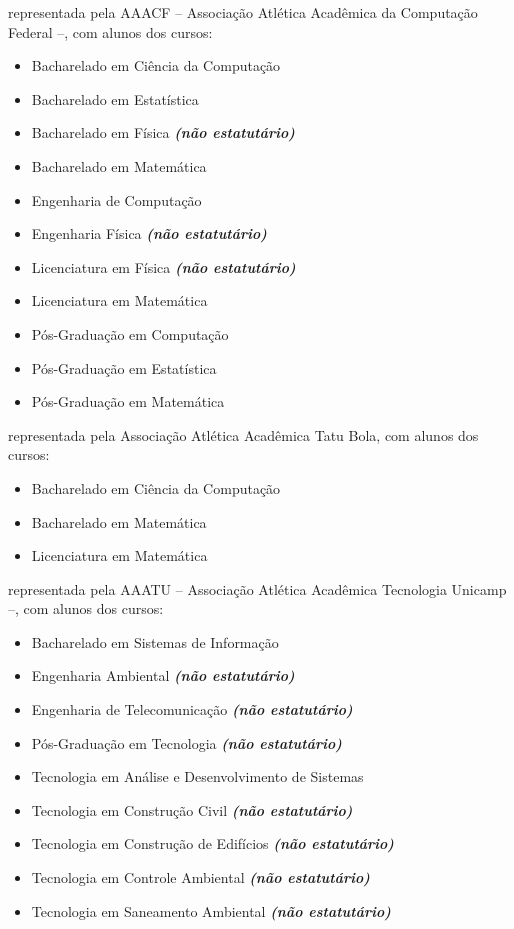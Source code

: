\begin{article}
\begin{description}[noitemsep]
		\item[UFSCar] representada pela AAACF -- Associação Atlética Acadêmica da Computação Federal --, com alunos dos cursos:
		\begin{itemize}[noitemsep]
			\item Bacharelado em Ciência da Computação
			\item Bacharelado em Estatística
			\item Bacharelado em Física \textbf{\textit{(não estatutário)}}
			\item Bacharelado em Matemática
			\item Engenharia de Computação
			\item Engenharia Física \textbf{\textit{(não estatutário)}}
			\item Licenciatura em Física \textbf{\textit{(não estatutário)}}
			\item Licenciatura em Matemática
			\item Pós-Graduação em Computação
			\item Pós-Graduação em Estatística
			\item Pós-Graduação em Matemática
		\end{itemize}

		\item[UNESP - Rio Claro] representada pela Associação Atlética Acadêmica Tatu Bola, com alunos dos cursos:
		\begin{itemize}[noitemsep]
			\item Bacharelado em Ciência da Computação
			\item Bacharelado em Matemática
			\item Licenciatura em Matemática
		\end{itemize}

		\item[UNICAMP - Limeira] representada pela AAATU -- Associação Atlética Acadêmica Tecnologia Unicamp --, com alunos dos cursos:
		\begin{itemize}[noitemsep]
			\item Bacharelado em Sistemas de Informação
			\item Engenharia Ambiental \textbf{\textit{(não estatutário)}}
			\item Engenharia de Telecomunicação \textbf{\textit{(não estatutário)}}
			\item Pós-Graduação em Tecnologia \textbf{\textit{(não estatutário)}}
			\item Tecnologia em Análise e Desenvolvimento de Sistemas
			\item Tecnologia em Construção Civil \textbf{\textit{(não estatutário)}}
			\item Tecnologia em Construção de Edifícios \textbf{\textit{(não estatutário)}}
			\item Tecnologia em Controle Ambiental \textbf{\textit{(não estatutário)}}
			\item Tecnologia em Saneamento Ambiental \textbf{\textit{(não estatutário)}}
		\end{itemize}


\end{description}
\end{article}
